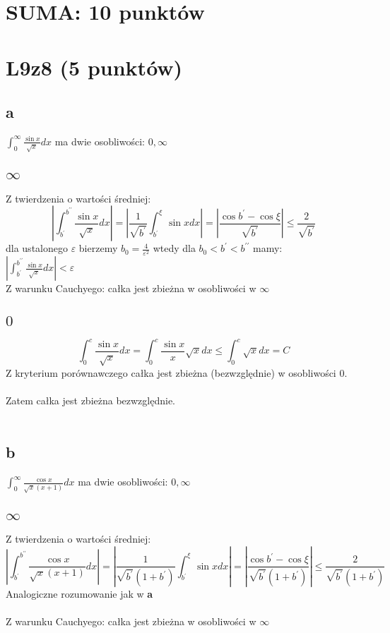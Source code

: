 \documentclass{article}
\title{}
\date{27.04.2020}
\author{Maurycy Borkowski}
\begin{document}
\maketitle

\section{SUMA: 10 punktów}
\section{L9z8 (5 punktów)}
\subsection*{a}
$\int_0^\infty \frac{\sin x}{\sqrt x} dx$ ma dwie osobliwości: $0,\infty$
\subsection*{$\infty$}
Z twierdzenia o wartości średniej:
$$
\left| \int_{b^\prime}^{b^{\prime\prime}} \frac{\sin x}{\sqrt x} dx \right | = \left | \frac{1}{\sqrt {b^\prime}} \int_{b^\prime}^\xi \sin x dx \right | = \left | \frac{\cos {b^\prime} - \cos {\xi}}{\sqrt {b^\prime}} \right | \leq \frac{2}{\sqrt {b^\prime}}
$$
dla ustalonego $\varepsilon$ bierzemy $b_0 = \frac{4}{\varepsilon^2}$ wtedy dla $b_0 < b^{\prime} < b^{\prime\prime}$ mamy:\\ $\left| \int_{b^\prime}^{b^{\prime\prime}} \frac{\sin x}{\sqrt x} dx \right | < \varepsilon$
\\Z warunku Cauchyego: całka jest zbieżna w osobliwości w $\infty$
\subsection*{$0$}
$$
\int_{0}^{c} \frac{\sin x}{\sqrt x} dx = \int_{0}^{c} \frac{\sin x}{x}{\sqrt x}dx \leq  \int_{0}^{c} {\sqrt x} dx = C
$$
Z kryterium porównawczego całka jest zbieżna (bezwzględnie) w osobliwości $0$.
\\\\
Zatem całka jest zbieżna bezwzględnie.\\\\
\subsection*{b}
$\int_0^\infty \frac{\cos x}{\sqrt x (x+1)} dx$ ma dwie osobliwości: $0,\infty$
\subsection*{$\infty$}
Z twierdzenia o wartości średniej:
$$
\left| \int_{b^\prime}^{b^{\prime\prime}} \frac{\cos x}{\sqrt x (x+1)} dx \right | = \left | \frac{1}{\sqrt {b^\prime} (1 + b^\prime)} \int_{b^\prime}^\xi \sin x dx \right | = \left | \frac{\cos {b^\prime} - \cos {\xi}}{{\sqrt {b^\prime} (1 + b^\prime)}} \right | \leq \frac{2}{\sqrt {b^\prime} (1 + b^\prime)}
$$
Analogiczne rozumowanie jak w \textbf{a}\\
\\Z warunku Cauchyego: całka jest zbieżna w osobliwości w $\infty$
\end{document}
